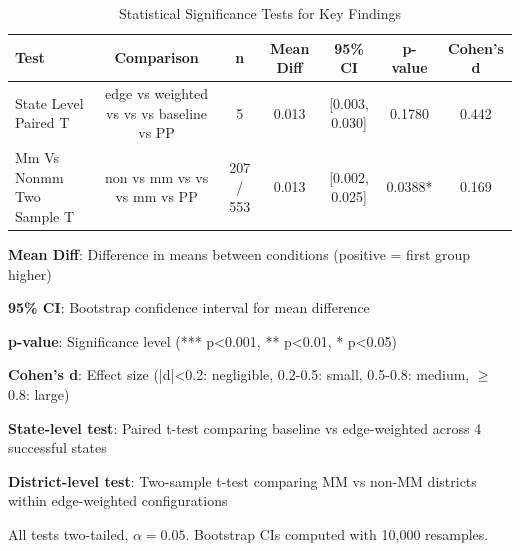 \begin{table}[H]
\centering
\caption{Statistical Significance Tests for Key Findings}
\label{tab:statistical_tests}
\begin{tabular}{lcccccc}
\toprule
\textbf{Test} & \textbf{Comparison} & \textbf{n} & \textbf{Mean Diff} & \textbf{95\% CI} & \textbf{p-value} & \textbf{Cohen's d} \\
\midrule
State Level Paired T & edge vs weighted vs vs vs baseline vs PP & 5 & 0.013 & [0.003, 0.030] & 0.1780 & 0.442 \\
Mm Vs Nonmm Two Sample T & non vs mm vs vs vs mm vs PP & 207 / 553 & 0.013 & [0.002, 0.025] & 0.0388* & 0.169 \\
\bottomrule
\end{tabular}
\begin{tablenotes}
\small
\item \textbf{Mean Diff}: Difference in means between conditions (positive = first group higher)
\item \textbf{95\% CI}: Bootstrap confidence interval for mean difference
\item \textbf{p-value}: Significance level (*** p<0.001, ** p<0.01, * p<0.05)
\item \textbf{Cohen's d}: Effect size (|d|<0.2: negligible, 0.2-0.5: small, 0.5-0.8: medium, $\geq$0.8: large)
\item \textbf{State-level test}: Paired t-test comparing baseline vs edge-weighted across 4 successful states
\item \textbf{District-level test}: Two-sample t-test comparing MM vs non-MM districts within edge-weighted configurations
\item All tests two-tailed, $\alpha = 0.05$. Bootstrap CIs computed with 10,000 resamples.
\end{tablenotes}
\end{table}
